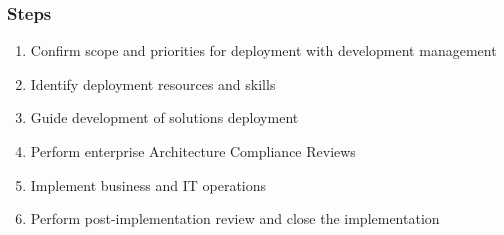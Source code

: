\documentclass[aspectratio=169, table]{beamer}
\begin{document}
	
	\begin{frame}
		\frametitle{Steps}
		\vspace{20pt}
		\begin{enumerate}
			\item Confirm scope and priorities for deployment with development management
			\item Identify deployment resources and skills
			\item Guide development of solutions deployment
			\item Perform enterprise Architecture Compliance Reviews
			\item Implement business and IT operations
			\item Perform post-implementation review and close the implementation
		\end{enumerate}
		
	\end{frame}
\end{document}
